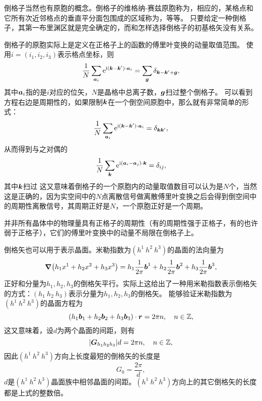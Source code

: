 倒格子当然也有原胞的概念。倒格子的维格纳-赛兹原胞称为，相应的，某格点和它所有次近邻格点的垂直平分面包围成的区域称为，等等。
只要给定一种倒格子，其第一布里渊区就是完全确定的，而和怎样选择倒格子的初基格矢没有关系。

倒格子的原胞实际上是定义在正格子上的函数的傅里叶变换的动量取值范围。
使用$i=(i_1, i_2, i_3)$表示格点坐标，则
\begin{equation}
    \frac{1}{N} \sum_{\vb*{a}_i} \mathrm{e}^{\mathrm{i} (\vb*{k} - \vb*{k}') \cdot \vb*{a}_i} = \sum_{\vb*{g}} \delta_{\vb*{k} - \vb*{k}' + \vb*{g}},
\end{equation}
其中$\vb*{a}_i$指的是$i$对应的位矢，$N$是晶格中总离子数，$\vb*{g}$扫过整个倒格子。
可以看到方程右边是周期性的，如果限制$\vb*{k}$在一个倒空间原胞中，那么就有非常简单的形式：
\begin{equation}
    \frac{1}{N} \sum_{\vb*{a}_i} \mathrm{e}^{\mathrm{i} (\vb*{k} - \vb*{k}') \cdot \vb*{a}_i} = \delta_{\vb*{k} \vb*{k}'},
\end{equation}
从而得到与之对偶的
\[
    \frac{1}{N} \sum_{\vb*{k}} \mathrm{e}^{\mathrm{i} (\vb*{a}_i - \vb*{a}_j) \cdot \vb*{k}} = \delta_{ij},
\]
其中$\vb*{k}$扫过
这又意味着倒格子的一个原胞内的动量取值数目可以认为是$N$个，当然这是正确的，因为实空间中的$N$点离散信号做离散傅里叶变换之后会得到倒空间中的周期性离散信号，其周期正好是$N$，一个原胞正好是一个周期。

并非所有晶体中的物理量具有正格子的周期性（有的周期性强于正格子，有的也许弱于正格子），它们的傅里叶变换中的动量不局限在倒格子上。

倒格矢也可以用于表示晶面。米勒指数为$(h^1 \  h^2 \  h^3)$的晶面的法向量为
\[
    \grad(h_1 x^1 + h_2 x^2 + h_3 x^3) = h_1 \frac{1}{2\pi} \vb*{b}^1 + h_2 \frac{1}{2\pi} \vb*{b}^2 + h_3 \frac{1}{2\pi} \vb*{b}^3,
\]
正好和分量为$h_1, h_2, h_3$的倒格矢平行。实际上这给出了一种用米勒指数表示倒格矢的方式：$(h_1 \ h_2 \ h_3)$表示分量为$h_1, h_2, h_3$的倒格矢。
能够验证米勒指数为$(h^1 \  h^2 \  h^3)$的晶面方程为
\begin{equation}
    (h_1 \vb*{b}_1 + h_2 \vb*{b}_2 + h_3 \vb*{b}_3) \cdot \vb*{r} = 2 \pi n, \quad n \in \mathbb{Z},
\end{equation}
这又意味着，设$d$为两个晶面的间距，则有
\begin{equation}
    \abs{\vb*{G}_{h_1 h_2 h_3}} d = 2 \pi n, \quad n \in \mathbb{Z},
\end{equation}
因此$(h^1 \  h^2 \  h^3)$方向上长度最短的倒格矢的长度是
\begin{equation}
    G_0 = \frac{2\pi}{d},
    \label{eq:miller-distance}
\end{equation}
$d$是$(h^1 \  h^2 \  h^3)$晶面族中相邻晶面的间距。$(h^1 \  h^2 \  h^3)$方向上的其它倒格矢的长度都是上式的整数倍。

